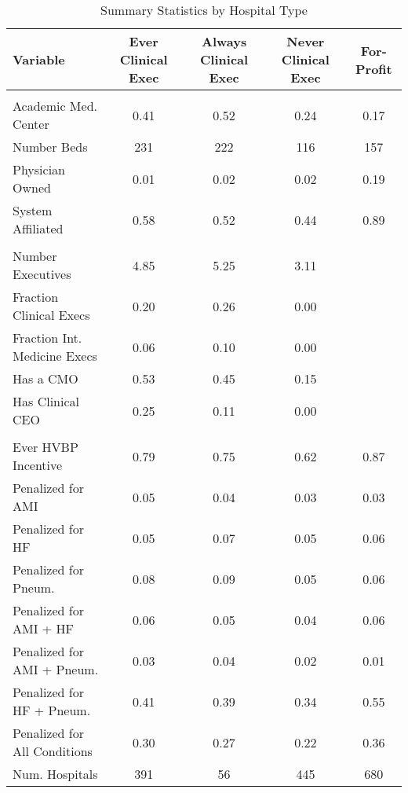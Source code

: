 \begin{table}[ht!]
\centering
\small
\caption{\label{tab:fp_samples_stable}Summary Statistics by Hospital Type}
\centering
\begin{tabular}[t]{lcccc}
\toprule
Variable & Ever Clinical Exec & Always Clinical Exec & Never Clinical Exec & For-Profit\\
\midrule
\addlinespace[0.3em]
\multicolumn{5}{l}{\textbf{Hospital Characteristics}}\\
\hspace{1em}Academic Med. Center & 0.41 & 0.52 & 0.24 & 0.17\\
\hspace{1em}Number Beds & 231 & 222 & 116 & 157\\
\hspace{1em}Physician Owned & 0.01 & 0.02 & 0.02 & 0.19\\
\hspace{1em}System Affiliated & 0.58 & 0.52 & 0.44 & 0.89\\
\addlinespace[0.3em]
\multicolumn{5}{l}{\textbf{Executive Team}}\\
\hspace{1em}Number Executives & 4.85 & 5.25 & 3.11 & \\
\hspace{1em}Fraction Clinical Execs & 0.20 & 0.26 & 0.00 & \\
\hspace{1em}Fraction Int. Medicine Execs & 0.06 & 0.10 & 0.00 & \\
\hspace{1em}Has a CMO & 0.53 & 0.45 & 0.15 & \\
\hspace{1em}Has Clinical CEO & 0.25 & 0.11 & 0.00 & \\
\addlinespace[0.3em]
\multicolumn{5}{l}{\textbf{Penalty/Payment Variables}}\\
\hspace{1em}Ever HVBP Incentive & 0.79 & 0.75 & 0.62 & 0.87\\
\hspace{1em}Penalized for AMI & 0.05 & 0.04 & 0.03 & 0.03\\
\hspace{1em}Penalized for HF & 0.05 & 0.07 & 0.05 & 0.06\\
\hspace{1em}Penalized for Pneum. & 0.08 & 0.09 & 0.05 & 0.06\\
\hspace{1em}Penalized for AMI + HF & 0.06 & 0.05 & 0.04 & 0.06\\
\hspace{1em}Penalized for AMI + Pneum. & 0.03 & 0.04 & 0.02 & 0.01\\
\hspace{1em}Penalized for HF + Pneum. & 0.41 & 0.39 & 0.34 & 0.55\\
\hspace{1em}Penalized for All Conditions & 0.30 & 0.27 & 0.22 & 0.36\\
\addlinespace[0.3em]
Num. Hospitals & 391 & 56 & 445 & 680\\
\bottomrule
\end{tabular}
\end{table}
